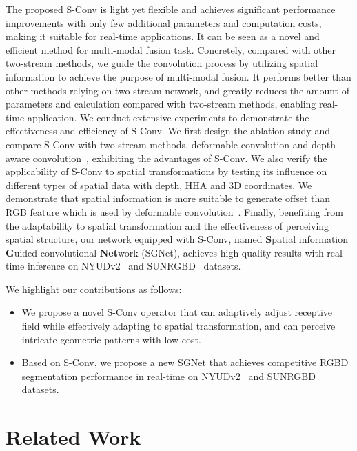\documentclass[journal]{IEEEtran}
\begin{document}
The proposed S-Conv is light yet flexible and achieves significant
performance improvements with only few additional
parameters  and computation costs, 
making it suitable for real-time applications.
It can be seen as a novel and efficient method for multi-modal fusion task.
Concretely, compared with other two-stream methods, 
we guide the convolution process by utilizing spatial information 
to achieve the purpose of multi-modal fusion. 
It performs better than other methods relying on two-stream network, 
and greatly reduces the amount of parameters and calculation compared 
with two-stream methods, enabling real-time application.
We conduct extensive experiments to demonstrate
the effectiveness and efficiency of S-Conv.
We first design the ablation
study and compare S-Conv with two-stream methods,
deformable convolution
\cite{deform, deformablev2} and depth-aware convolution~\cite{dcnn}, 
exhibiting the advantages of S-Conv.
We also verify the applicability of S-Conv to spatial transformations
by testing its influence on different types of spatial
data with depth, HHA and 3D coordinates. We demonstrate that 
spatial information is more suitable to generate offset than 
RGB feature which is used by deformable convolution~\cite{deform, deformablev2}.
Finally, benefiting from the adaptability to spatial transformation
and the effectiveness of perceiving spatial structure,
our network equipped with S-Conv, named 
\textbf{S}patial information \textbf{G}uided convolutional 
\textbf{Net}work (SGNet),
achieves high-quality results with real-time inference on
NYUDv2~\cite{nyud} and SUNRGBD~\cite{sunrgbd, sunrgbd2} datasets.


We highlight our contributions as follows:
\begin{itemize}
	\item
	We propose a novel 
S-Conv
	operator that
	can adaptively adjust receptive field
	while effectively adapting to spatial transformation, and can perceive
	intricate geometric patterns with low cost.
\item
	Based on S-Conv, we propose a new 
SGNet that achieves
	competitive RGBD segmentation performance in real-time on NYUDv2~\cite{nyud} and
	SUNRGBD~\cite{sunrgbd, sunrgbd2} datasets.
\end{itemize}

\section{Related Work}
\end{document}
